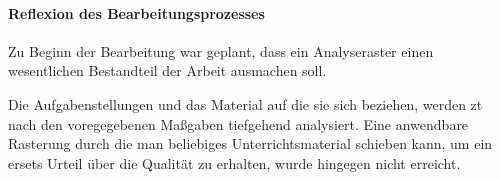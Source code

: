 



\paragraph{Reflexion des Bearbeitungsprozesses}

Zu Beginn der Bearbeitung war geplant, dass ein Analyseraster einen wesentlichen Bestandteil der Arbeit ausmachen soll. 


Die Aufgabenstellungen und das Material auf die sie sich beziehen, werden \gls{zt} nach den voregegebenen Maßgaben tiefgehend analysiert. Eine anwendbare Rasterung durch die man beliebiges Unterrichtsmaterial schieben kann, um ein ersets Urteil über die Qualität zu erhalten, wurde hingegen nicht erreicht. 
















